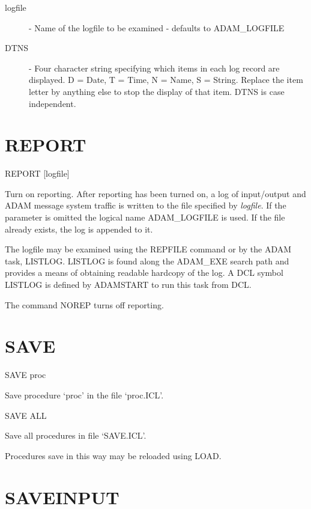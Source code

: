 \documentclass[twoside,11pt,nolof,chapters]{starlink}
\begin{document}
\begin{description}

\item[logfile] -  Name of the logfile to be examined - defaults to
ADAM\_LOGFILE

\item[DTNS]  -  Four character string specifying which items in each log
record are displayed.
D = Date, T = Time, N = Name, S = String.
Replace the item letter by anything else to stop the display of that item.
DTNS is case independent.

\end{description}

\section{REPORT\label{REPORT}}

    REPORT \hspace{.5cm} [logfile]

Turn on reporting. After reporting has been turned on, a log of input/output and
ADAM message system traffic is written to the file specified by \textit{logfile}.
If the parameter is omitted the logical name ADAM\_LOGFILE is used.
If the file already exists, the log is appended to it.

The logfile may be examined using the REPFILE command or by the ADAM task,
LISTLOG. LISTLOG is found along the ADAM\_EXE search path and provides a means
of obtaining readable hardcopy of the log. A DCL symbol LISTLOG is defined
by ADAMSTART to run this task from DCL.

The command NOREP turns off reporting.


\section{SAVE\label{SAVE}}

   SAVE \hspace{.5cm} proc

 Save procedure `proc' in the file `proc.ICL'.

   SAVE  ALL

 Save all procedures in file `SAVE.ICL'.

 Procedures save in this way may be reloaded using LOAD.

\section{SAVEINPUT\label{SAVEINPUT}}
\end{document}
